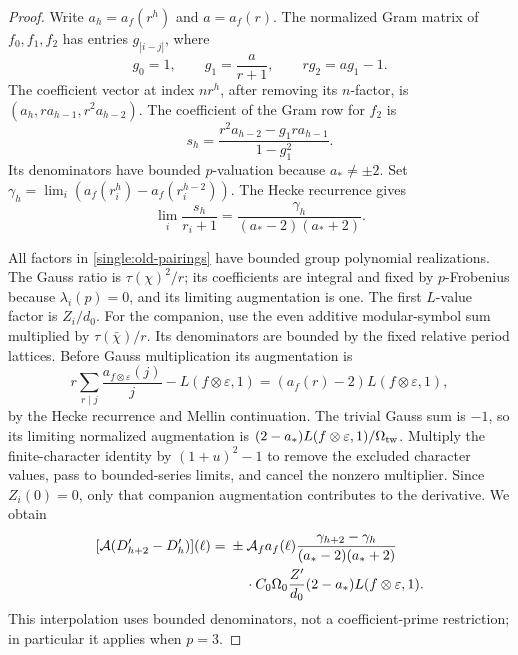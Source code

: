 \begin{proof}
Write \(a_h=a_f(r^h)\) and \(a=a_f(r)\).  The normalized
Gram matrix of \(f_0,f_1,f_2\) has entries \(g_{|i-j|}\), where
\[
 g_0=1,\qquad g_1=\frac a{r+1},\qquad rg_2=ag_1-1.
\]
The coefficient vector at index \(nr^h\), after removing its
\(n\)-factor, is \((a_h,ra_{h-1},r^2a_{h-2})\).  The
coefficient of the Gram row for \(f_2\) is
\[
 s_h=\frac{r^2a_{h-2}-g_1ra_{h-1}}{1-g_1^2}.
\]
Its denominators have bounded \(p\)-valuation because
\(a_*\ne\pm2\).  Set
\(\gamma_h=\lim_i(a_f(r_i^h)-a_f(r_i^{h-2}))\).  The
Hecke recurrence gives
\[
 \lim_i\frac{s_h}{r_i+1}
       =\frac{\gamma_h}{(a_*-2)(a_*+2)}.
\]

All factors in \eqref{single:old-pairings} have bounded group
polynomial realizations.  The Gauss ratio is
\(\tau(\chi)^2/r\); its coefficients are integral and fixed
by \(p\)-Frobenius because \(\lambda_i(p)=0\), and its
limiting augmentation is one.  The first \(L\)-value factor
is \(Z_i/d_0\).  For the companion, use the even additive
modular-symbol sum multiplied by \(\tau(\bar\chi)/r\).
Its denominators are bounded by the fixed relative period
lattices.  Before Gauss multiplication its augmentation is
\[
 r\sum_{r\mid j}\frac{a_{f\otimes\varepsilon}(j)}j
    -L(f\otimes\varepsilon,1)
      =(a_f(r)-2)L(f\otimes\varepsilon,1),
\]
by the Hecke recurrence and Mellin continuation.  The trivial
Gauss sum is \(-1\), so its limiting normalized augmentation
is \((2-a_*)L(f\otimes\varepsilon,1)/\Omega_{\rm tw}\).
Multiply the finite-character identity by \((1+u)^2-1\) to
remove the excluded character values, pass to bounded-series
limits, and cancel the nonzero multiplier.  Since \(Z_i(0)=0\),
only that companion augmentation contributes to the derivative.
We obtain
\begin{equation}\label{single:projected-derivative}
 \begin{split}
 [\mathcal A(D'_{h+2}-D'_h)](\ell)
   ={}&\pm\mathcal A_fa_f(\ell)
       \frac{\gamma_{h+2}-\gamma_h}{(a_*-2)(a_*+2)}\\
      &\hspace{4mm}\cdot C_0\Omega_0\frac{Z'}{d_0}
                     (2-a_*)L(f\otimes\varepsilon,1).
 \end{split}
\end{equation}
This interpolation uses bounded denominators, not a
coefficient-prime restriction; in particular it applies when
\(p=3\).


\end{proof}
